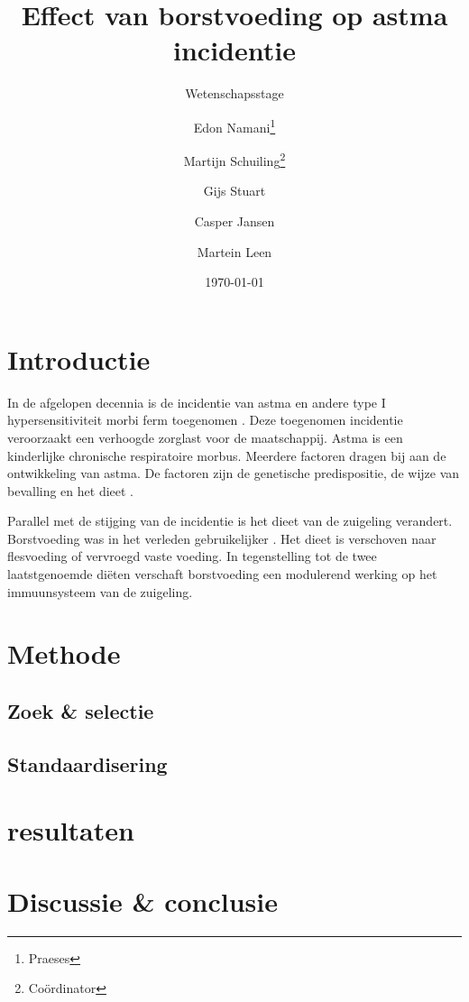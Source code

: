 \documentclass[abstract=true]{scrartcl}
\title{Effect van borstvoeding op astma incidentie}
\subtitle{Wetenschapsstage}
\author{Edon Namani\thanks{Praeses} \and Martijn Schuiling\thanks{Co\"ordinator} \and Gijs Stuart \and Casper Jansen \and Martein Leen}
\date{\today}
\begin{document}
\maketitle
    \begin{abstract}

    \end{abstract}

\section{Introductie}
In de afgelopen decennia is de incidentie van astma en andere type I hypersensitiviteit morbi ferm toegenomen \cite{Platts_Mills_2015}. Deze toegenomen incidentie veroorzaakt een verhoogde zorglast voor de maatschappij. Astma is een kinderlijke chronische respiratoire morbus. Meerdere factoren dragen bij aan de ontwikkeling van astma. De factoren zijn de genetische predispositie, de wijze van bevalling en het dieet \cite{abbas2017cellular,Houghteling_2015}.

Parallel met de stijging van de incidentie is het dieet van de zuigeling verandert. Borstvoeding was in het verleden gebruikelijker \cite{world1981contemporary,Victora_2016}. Het dieet is verschoven naar flesvoeding of vervroegd vaste voeding. In tegenstelling tot de twee laatstgenoemde diëten verschaft borstvoeding een modulerend werking op het immuunsysteem van de zuigeling.

\section{Methode}
    \subsection{Zoek \& selectie}

    \subsection{Standaardisering}

\section{resultaten}

\section{Discussie \& conclusie}

\printbibliography 
\end{document}
